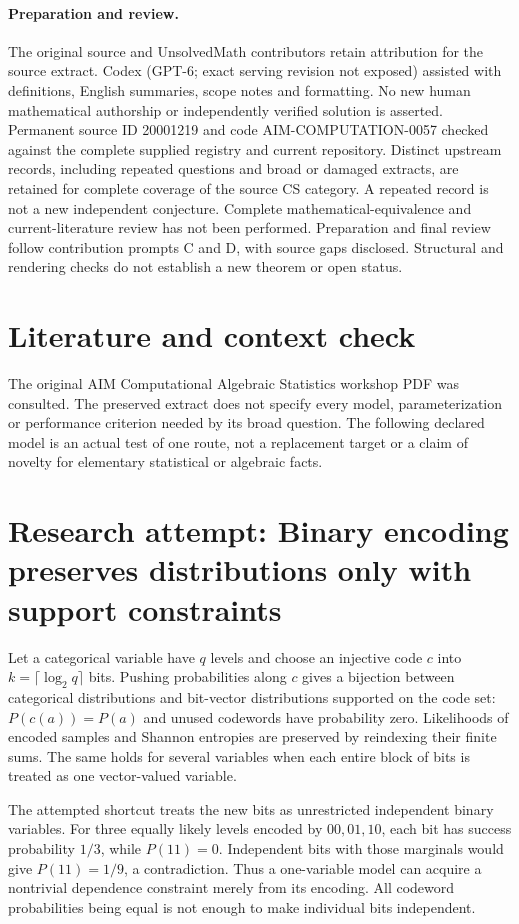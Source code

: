 \documentclass[11pt]{article}
\begin{document}
\paragraph{Preparation and review.}
The original source and UnsolvedMath contributors retain attribution for the source extract. Codex (GPT-6; exact serving revision not exposed) assisted with definitions, English summaries, scope notes and formatting. No new human mathematical authorship or independently verified solution is asserted. Permanent source ID 20001219 and code AIM-COMPUTATION-0057 checked against the complete supplied registry and current repository. Distinct upstream records, including repeated questions and broad or damaged extracts, are retained for complete coverage of the source CS category. A repeated record is not a new independent conjecture. Complete mathematical-equivalence and current-literature review has not been performed. Preparation and final review follow contribution prompts C and D, with source gaps disclosed. Structural and rendering checks do not establish a new theorem or open status.
\label{end:20001219}

\section{Literature and context check}
The original AIM Computational Algebraic Statistics
 workshop PDF was consulted. The preserved extract does not specify every model,
 parameterization or performance criterion needed by its broad question. The
 following declared model is an actual test of one route, not a replacement
 target or a claim of novelty for elementary statistical or algebraic facts.
\section{Research attempt: Binary encoding preserves distributions only with support constraints}
Let a categorical variable have $q$ levels and choose an injective code
$c$ into $k=\lceil\log_2q\rceil$ bits. Pushing probabilities along $c$ gives
a bijection between categorical distributions and bit-vector distributions
supported on the code set: $P(c(a))=P(a)$ and unused codewords have probability
zero. Likelihoods of encoded samples and Shannon entropies are preserved by
reindexing their finite sums. The same holds for several variables when each
entire block of bits is treated as one vector-valued variable.

The attempted shortcut treats the new bits as unrestricted independent binary
variables. For three equally likely levels encoded by $00,01,10$, each bit
has success probability $1/3$, while $P(11)=0$. Independent bits with those
marginals would give $P(11)=1/9$, a contradiction. Thus a one-variable model
can acquire a nontrivial dependence constraint merely from its encoding.
All codeword probabilities being equal is not enough to make individual bits
independent.
\end{document}
